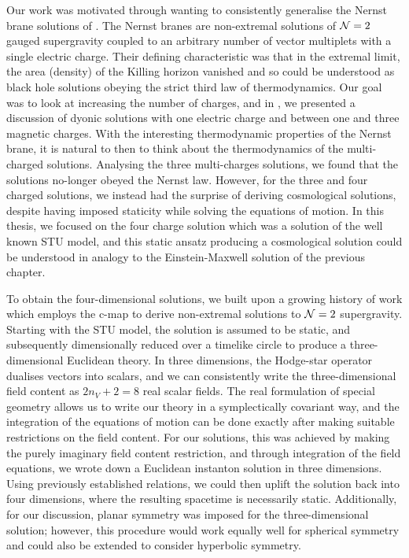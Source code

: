 Our work was motivated through wanting to consistently generalise the Nernst brane solutions of \cite{Dempster:2015}. The Nernst branes are non-extremal solutions of ${\cal N} = 2$ gauged supergravity coupled to an arbitrary number of vector multiplets with a single electric charge. Their defining characteristic was that in the extremal limit, the area (density) of the Killing horizon vanished and so could be understood as black hole solutions obeying the strict third law of thermodynamics. Our goal was to look at increasing the number of charges, and in \cite{Gutowski:2019iyo}, we presented a discussion of dyonic solutions with one electric charge and between one and three magnetic charges. With the interesting thermodynamic properties of the Nernst brane, it is natural to then to think about the thermodynamics of the multi-charged solutions. Analysing the three multi-charges solutions, we found that the solutions no-longer obeyed the Nernst law. However, for the three and four charged solutions, we instead had the surprise of deriving cosmological solutions, despite having imposed staticity while solving the equations of motion. In this thesis, we focused on the four charge solution which was a solution of the well known STU model, and this static ansatz producing a cosmological solution could be understood in analogy to the Einstein-Maxwell solution of the previous chapter.

To obtain the four-dimensional solutions, we built upon a growing history of work which employs the c-map to derive non-extremal solutions to ${\cal N} = 2$ supergravity. Starting with the STU model, the solution is assumed to be static, and subsequently dimensionally reduced over a timelike circle to produce a three-dimensional Euclidean theory. In three dimensions, the Hodge-star operator dualises vectors into scalars, and we can consistently write the three-dimensional field content as $2n_V + 2 = 8$ real scalar fields. The real formulation of special geometry allows us to write our theory in a symplectically covariant way, and the integration of the equations of motion can be done exactly after making suitable restrictions on the field content. For our solutions, this was achieved by making the purely imaginary field content restriction, and through integration of the field equations, we wrote down a Euclidean instanton solution in three dimensions. Using previously established relations, we could then uplift the solution back into four dimensions, where the resulting spacetime is necessarily static. Additionally, for our discussion, planar symmetry was imposed for the three-dimensional solution; however, this procedure would work equally well for spherical symmetry and could also be extended to consider hyperbolic symmetry.

